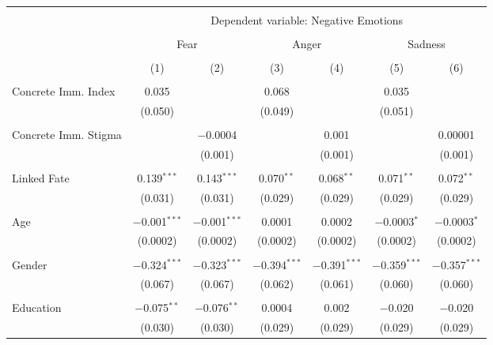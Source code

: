 
\begin{table}[!htbp] \centering 
  \caption{} 
  \label{} 
\begin{tabular}{@{\extracolsep{5pt}}lcccccc} 
\\[-1.8ex]\hline 
\hline \\[-1.8ex] 
 & \multicolumn{6}{c}{Dependent variable: Negative Emotions} \\ 
\cline{2-7} 
\\[-1.8ex] & \multicolumn{2}{c}{Fear} & \multicolumn{2}{c}{Anger} & \multicolumn{2}{c}{Sadness} \\ 
\\[-1.8ex] & (1) & (2) & (3) & (4) & (5) & (6)\\ 
\hline \\[-1.8ex] 
 Concrete Imm. Index & 0.035 &  & 0.068 &  & 0.035 &  \\ 
  & (0.050) &  & (0.049) &  & (0.051) &  \\ 
  & & & & & & \\ 
 Concrete Imm. Stigma &  & $-$0.0004 &  & 0.001 &  & 0.00001 \\ 
  &  & (0.001) &  & (0.001) &  & (0.001) \\ 
  & & & & & & \\ 
 Linked Fate & 0.139$^{***}$ & 0.143$^{***}$ & 0.070$^{**}$ & 0.068$^{**}$ & 0.071$^{**}$ & 0.072$^{**}$ \\ 
  & (0.031) & (0.031) & (0.029) & (0.029) & (0.029) & (0.029) \\ 
  & & & & & & \\ 
 Age & $-$0.001$^{***}$ & $-$0.001$^{***}$ & 0.0001 & 0.0002 & $-$0.0003$^{*}$ & $-$0.0003$^{*}$ \\ 
  & (0.0002) & (0.0002) & (0.0002) & (0.0002) & (0.0002) & (0.0002) \\ 
  & & & & & & \\ 
 Gender & $-$0.324$^{***}$ & $-$0.323$^{***}$ & $-$0.394$^{***}$ & $-$0.391$^{***}$ & $-$0.359$^{***}$ & $-$0.357$^{***}$ \\ 
  & (0.067) & (0.067) & (0.062) & (0.061) & (0.060) & (0.060) \\ 
  & & & & & & \\ 
 Education & $-$0.075$^{**}$ & $-$0.076$^{**}$ & 0.0004 & 0.002 & $-$0.020 & $-$0.020 \\ 
  & (0.030) & (0.030) & (0.029) & (0.029) & (0.029) & (0.029) \\ 

\end{tabular}
\end{table}
